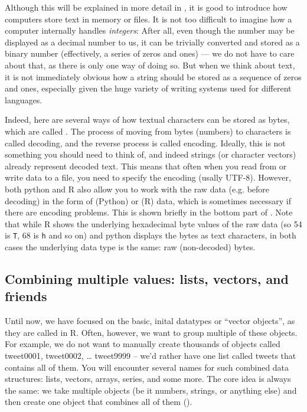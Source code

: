 Although this will be explained in more detail in ,
it is good to introduce how computers store text in memory or files. 
It is not too difficult to imagine how a computer internally
handles \emph{integers}: After all, even though the number may be displayed
as a decimal number to us, it can be trivially converted and stored
as a binary number (effectively, a series of zeros and ones)
--- we do not have to care about that, as there
is only one way of doing so.
But when we think about text, it is not
immediately obvious how a string should be stored as a sequence of
zeros and ones, especially given the huge variety of writing systems used for different languages. 

Indeed, here are several ways of how textual characters can be stored as bytes,
which are called . 
The process of moving from bytes (numbers) to characters is called decoding,
and the reverse process is called encoding. 
Ideally, this is not something you should need to think of,
and indeed strings (or character vectors) already represent decoded text.
This means that often when you read from or write data to a file,
you need to specify the encoding (usally UTF-8). 
However, both python and R also allow you to work with the raw data
(e.g. before decoding) in the form of  (Python) or  (R) data,
which is sometimes necessary if there are encoding problems.
This is shown briefly in the bottom part of .
Note that while R shows the underlying hexadecimal byte values of the raw data (so 54 is \verb|T|, 68 is \verb|h| and so on) and python displays the bytes as text characters, in both cases the underlying data type is the same: raw (non-decoded) bytes.



\subsection{Combining multiple values: lists, vectors, and friends}

Until now, we have focused on the basic, inital datatypes or ``vector
objects'', as they are called in R.  Often, however, we want to group
multiple of these objects. For example, we do not want to manually
create thousands of objects called tweet0001, tweet0002, \ldots
tweet9999 -- we'd rather have one list called tweets that contains all
of them. You will encounter several names for such combined data
structures: lists, vectors, arrays, series, and some
more. 
The core idea is always the same: we take multiple objects
(be it numbers, strings, or anything else) and then create one object that combines all of them ().


